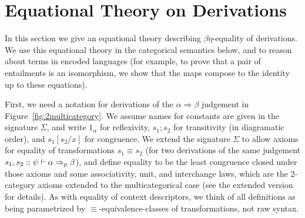 \documentclass[a4paper,USenglish,numberwithinsect]{lipics-v2016}
\newcommand\deq{\ensuremath{\equiv}}
\newcommand\spr{\ensuremath{\Rightarrow}} %
\begin{document}

\section{Equational Theory on Derivations}
\label{sec:equational}

In this section we give an equational theory describing $\beta\eta$-equality of
derivations.  We use this equational theory in the categorical semantics
below, and to reason about terms in encoded languages (for example, to
prove that a pair of entailments is an isomorphism, we show that the
maps compose to the identity up to these equations).

First, we need a notation for derivations of the $\alpha \spr \beta$
judgement in Figure~\ref{fig:2multicategory}.  We assume names for
constants are given in the signature $\Sigma$, and write $1_\alpha$ for
reflexivity, $s_1;s_2$ for transitivity (in diagramatic order), and
$s_1[s_2/x]$ for congruence.  We extend the signature $\Sigma$ to allow
axioms for equality of transformations $s_1 \deq s_2$ (for two
derivations of the same judgement $s_1,s_2 ::
\wfsp{\psi}{\alpha}{\beta}{p}$), and define equality to be the least
congruence closed under those axioms and some associativity, unit, and
interchange laws, which are the 2-category axioms extended to the
multicategorical case (see the extended version for details).  As with
equality of context descriptors, we think of all definitions as being
parametrized by \deq-equivalence-classes of transformations, not raw
syntax.
\end{document}
